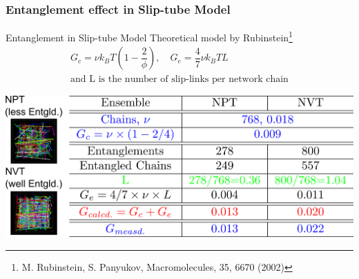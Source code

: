 \documentclass[12pt, dvipdfmx]{beamer}
\begin{document}
\begin{frame}
	\frametitle{
		Entanglement effect in Slip-tube Model
	}
	\vspace{-1mm}
	\begin{alertblock}{Entanglement in Slip-tube Model}
			\footnotesize
			Theoretical model by Rubinstein\footnote{
				\scriptsize{M. Rubinstein, S. Panyukov, Macromolecules, 35, 6670 (2002)}
				}
			\vspace{-3mm}
			\scriptsize
			\begin{align*}
				G_c = \nu k_B T \left(1-\dfrac{2}{\phi} \right), \quad G_e = \dfrac{4}{7} \nu k_B T L \\
				\text{and L is the number of slip-links per network chain}
			\end{align*}
	\end{alertblock}
	\vspace{2mm}
	\centering
			\includegraphics[width=.9\textwidth]{Entanglement_Comp.png}
	\scriptsize
\end{frame}
\end{document}

